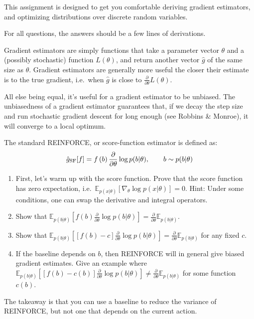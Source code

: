 \documentclass{harvardml}
\newcommand{\E}{\mathbb{E}}
\newcommand{\PT}{\frac{\partial}{\partial \theta}}
\theoremstyle{plain}
\begin{document}
This assignment is designed to get you comfortable deriving gradient estimators, and optimizing distributions over discrete random variables.

For all questions, the answers should be a few lines of derivations.


\begin{problem}

Gradient estimators are simply functions that take a parameter vector $\theta$ and a (possibly stochastic) function $L(\theta)$, and return another vector $\hat g$ of the same size as $\theta$.
Gradient estimators are generally more useful the closer their estimate is to the true gradient, i.e.\ when $\hat g$ is close to $\PT L(\theta)$.

All else being equal, it's useful for a gradient estimator to be unbiased.
The unbiasedness of a gradient estimator guarantees that, if we decay the step size and run stochastic gradient descent for long enough (see Robbins \& Monroe), it will converge to a local optimum.

The standard REINFORCE, or score-function estimator is defined as:
%
\begin{align}
\hat g_\textnormal{SF}[f] = f \left( b \right) \PT \log p(b | \theta), \qquad b \sim p(b | \theta)
\end{align}
%
\begin{enumerate}[label=(\alph*)]
\item First, let's warm up with the score function.  Prove that the score function has zero expectation, i.e.\ $\E_{p(x|\theta)} \left[ \nabla_\theta \log p(x|\theta) \right] = 0$.
Hint: Under some conditions, one can swap the derivative and integral operators.
\item Show that $\E_{p(b|\theta)} \left[ f(b) \PT \log p(b | \theta) \right] = \PT \E_{p(b|\theta)}$.
\item Show that $\E_{p(b|\theta)} \left[ [f(b) - c] \PT \log p(b | \theta) \right] = \PT \E_{p(b|\theta)}$ for any fixed $c$.
\item If the baseline depends on $b$, then REINFORCE will in general give biased gradient estimates.
Give an example where $\E_{p(b|\theta)} \left[ [f(b) - c(b)] \PT \log p(b | \theta) \right] \neq \PT \E_{p(b|\theta)}$ for some function $c(b)$.
\end{enumerate}

The takeaway is that you can use a baseline to reduce the variance of REINFORCE, but not one that depends on the current action.
\end{problem}
\end{document}
